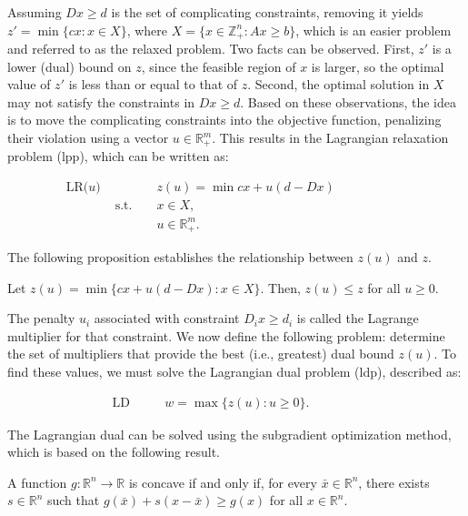 Assuming $Dx \geq d$ is the set of complicating constraints, removing it yields
$z' = \min \{cx : x \in X\}$, where $X = \{x \in \mathbb{Z}^n_+ : Ax \geq b\}$,
which is an easier problem and referred to as the relaxed problem. Two facts can
be observed. First, $z'$ is a lower (dual) bound on $z$, since the feasible
region of $x$ is larger, so the optimal value of $z'$ is less than or equal to
that of $z$. Second, the optimal solution in $X$ may not satisfy the constraints
in $Dx \geq d$. Based on these observations, the idea is to move the
complicating constraints into the objective function, penalizing their violation
using a vector $u \in \mathbb{R}^{m}_+$. This results in the Lagrangian
relaxation problem (\gls{lpp}), which can be written as:

\begin{align*}
	\text{LR($u$) } &              &  & z(u) = \min cx + u(d - Dx) &  &  &  &  &  &  &   \\
	                & \text{s.t. } &  & x \in X,                   &  &  &  &  &  &  &   \\
	                &              &  & u \in \mathbb{R}^m_+.      &  &  &  &  &  &  & 
\end{align*}

The following proposition establishes the relationship between $z(u)$ and $z$.

\begin{proposition}
	Let $z(u) = \min \{cx + u (d - Dx) : x \in X\}$. Then, $z(u) \leq z$ for all $u \geq 0$.
\end{proposition}

The penalty $u_i$ associated with constraint $D_ix \geq d_i$ is called the
Lagrange multiplier for that constraint. We now define the following problem:
determine the set of multipliers that provide the best (i.e., greatest) dual
bound $z(u)$. To find these values, we must solve the Lagrangian dual problem
(\gls{ldp}), described as:

\begin{align*}
	\text{LD } &  &  & w = \max \{z(u) : u \geq 0\}. &  &  &  &  & 
\end{align*}

The Lagrangian dual can be solved using the subgradient optimization method,
which is based on the following result.

\begin{proposition} \label{proposition:convex}
	A function $g : \mathbb{R}^n \rightarrow \mathbb{R}$ is concave if and only if, for every $\bar{x} \in \mathbb{R}^n$, there exists $s \in \mathbb{R}^n$ such that $g(\bar{x}) + s(x - \bar{x}) \geq g(x)$ for all $x \in \mathbb{R}^n$.
\end{proposition}

